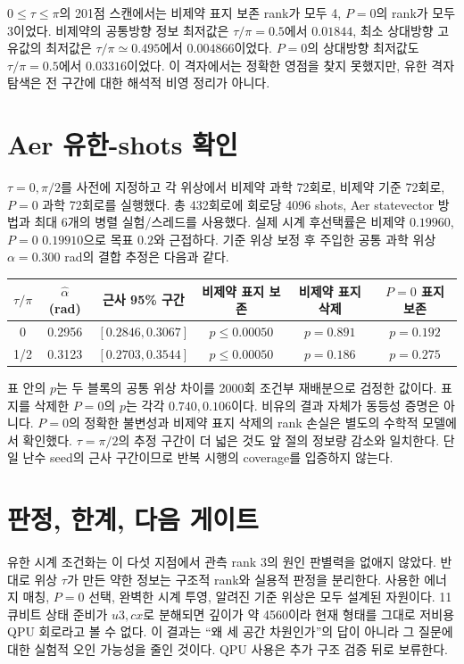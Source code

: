 \documentclass[11pt,a4paper]{article}
\begin{document}
$0\le\tau\le\pi$의 201점 스캔에서는 비제약 표지 보존 rank가 모두 4,
$P=0$의 rank가 모두 3이었다. 비제약의 공통방향 정보 최저값은
$\tau/\pi=0.5$에서 $0.01844$, 최소 상대방향 고유값의 최저값은
$\tau/\pi\simeq0.495$에서 $0.004866$이었다. $P=0$의 상대방향
최저값도 $\tau/\pi=0.5$에서 $0.03316$이었다. 이 격자에서는
정확한 영점을 찾지 못했지만, 유한 격자 탐색은 전 구간에 대한 해석적
비영 정리가 아니다.

\section{Aer 유한-shots 확인}
$\tau=0,\pi/2$를 사전에 지정하고 각 위상에서 비제약 과학 72회로,
비제약 기준 72회로, $P=0$ 과학 72회로를 실행했다. 총 432회로에
회로당 4096 shots, Aer statevector 방법과 최대 6개의 병렬 실험/스레드를
사용했다. 실제 시계 후선택률은 비제약 $0.19960$, $P=0$ $0.19910$으로
목표 $0.2$와 근접하다. 기준 위상 보정 후 주입한 공통 과학 위상
$\alpha=0.300$ rad의 결합 추정은 다음과 같다.
\begin{center}
\begin{tabular}{@{}cccccc@{}}
\toprule
$\tau/\pi$ & $\hat\alpha$ (rad) & 근사 95\% 구간 & 비제약 표지 보존
& 비제약 표지 삭제 & $P=0$ 표지 보존 \\
\midrule
0 & 0.2956 & $[0.2846,0.3067]$ & $p\le0.00050$ & $p=0.891$ & $p=0.192$ \\
1/2 & 0.3123 & $[0.2703,0.3544]$ & $p\le0.00050$ & $p=0.186$ & $p=0.275$ \\
\bottomrule
\end{tabular}
\end{center}
표 안의 $p$는 두 블록의 공통 위상 차이를 2000회 조건부 재배분으로
검정한 값이다. 표지를 삭제한 $P=0$의 $p$는 각각 $0.740,0.106$이다.
비유의 결과 자체가 동등성 증명은 아니다. $P=0$의 정확한 불변성과
비제약 표지 삭제의 rank 손실은 별도의 수학적 모델에서 확인했다.
$\tau=\pi/2$의 추정 구간이 더 넓은 것도 앞 절의 정보량 감소와 일치한다.
단일 난수 seed의 근사 구간이므로 반복 시행의 coverage를 입증하지 않는다.

\section{판정, 한계, 다음 게이트}
유한 시계 조건화는 이 다섯 지점에서 관측 rank 3의 원인 판별력을
없애지 않았다. 반대로 위상 $\tau$가 만든 약한 정보는 구조적 rank와
실용적 판정을 분리한다. 사용한 에너지 매칭, $P=0$ 선택, 완벽한 시계
투영, 알려진 기준 위상은 모두 설계된 자원이다. 11큐비트 상태 준비가
$u3,cx$로 분해되면 깊이가 약 4560이라 현재 형태를 그대로 저비용 QPU
회로라고 볼 수 없다. 이 결과는 ``왜 세 공간 차원인가''의 답이 아니라
그 질문에 대한 실험적 오인 가능성을 줄인 것이다. QPU 사용은 추가
구조 검증 뒤로 보류한다.
\end{document}
